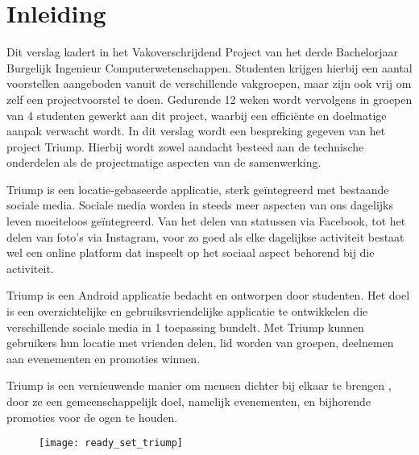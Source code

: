 \chapter{Inleiding}
Dit verslag kadert in het Vakoverschrijdend Project van het derde Bachelorjaar Burgelijk Ingenieur Computerwetenschappen. Studenten krijgen hierbij een aantal voorstellen aangeboden vanuit de verschillende vakgroepen, maar zijn ook vrij om zelf een projectvoorstel te doen. Gedurende 12 weken wordt vervolgens in groepen van 4 studenten gewerkt aan dit project, waarbij een efficiënte en doelmatige aanpak verwacht wordt. In dit verslag wordt een bespreking gegeven van het project Triump. Hierbij wordt zowel aandacht besteed aan de technische onderdelen als de projectmatige aspecten van de samenwerking.


Triump is een locatie-gebaseerde applicatie, sterk geïntegreerd met bestaande sociale media.
Sociale media worden in steeds meer aspecten van ons dagelijks leven moeiteloos geïntegreerd. Van het delen van statussen via Facebook, tot het delen van foto’s via Instagram, voor zo goed als elke dagelijkse activiteit bestaat wel een online platform dat inspeelt op het sociaal aspect behorend bij die activiteit.

Triump is een Android applicatie bedacht en ontworpen door studenten. Het doel is een overzichtelijke en gebruiksvriendelijke applicatie te ontwikkelen die verschillende sociale media in 1 toepassing bundelt. Met Triump kunnen gebruikers hun locatie met vrienden delen, lid worden van groepen, deelnemen aan evenementen en promoties winnen.

Triump is een vernieuwende manier om mensen dichter bij elkaar te brengen%
, door ze een gemeenschappelijk doel, namelijk evenementen, en bijhorende promoties voor de ogen te houden.


\begin{figure}[H]
	\centering
	\texttt{[image: ready\_set\_triump]}
	\label{fig:inleiding}
	
\end{figure}
